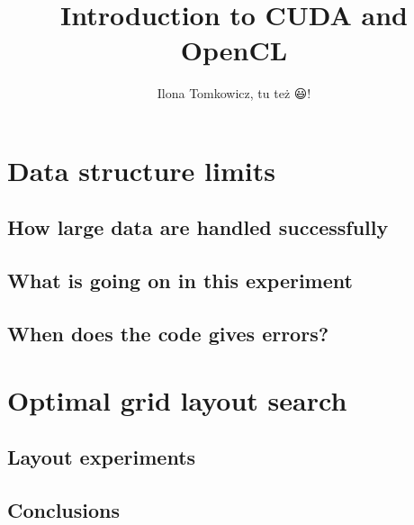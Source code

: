 \documentclass[12pt]{article}
\begin{document}
\title{Introduction to CUDA and OpenCL}
\author{Ilona Tomkowicz, tu też 😃!}

\maketitle
\tableofcontents
\newpage

\section{Data structure limits} 
\subsection{How large data are handled successfully} 
\subsection{What is going on in this experiment}
\subsection{When does the code gives errors?}
\section{Optimal grid layout search} 
\subsection{Layout experiments}
\subsection{Conclusions}
\end{document}
